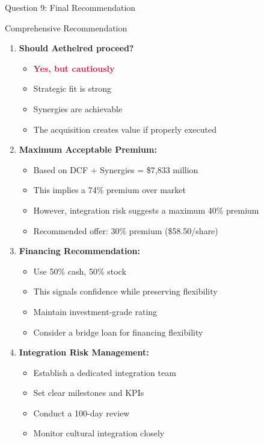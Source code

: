 \documentclass[aspectratio=169]{beamer}
\newcommand{\highlight}[1]{\textcolor{crimson}{\textbf{#1}}}
\begin{document}
	\begin{frame}{Question 9: Final Recommendation}
		
		\begin{block}{Comprehensive Recommendation}
			
			\begin{enumerate}
				\item \textbf{Should Aethelred proceed?}
				\begin{itemize}
					\item \highlight{Yes, but cautiously}
					\item Strategic fit is strong
					\item Synergies are achievable
					\item The acquisition creates value if properly executed
				\end{itemize}
				
				\item \textbf{Maximum Acceptable Premium:}
				\begin{itemize}
					\item Based on DCF + Synergies = \$7,833 million
					\item This implies a 74\% premium over market
					\item However, integration risk suggests a maximum 40\% premium
					\item Recommended offer: 30\% premium (\$58.50/share)
				\end{itemize}
				
				\item \textbf{Financing Recommendation:}
				\begin{itemize}
					\item Use 50\% cash, 50\% stock
					\item This signals confidence while preserving flexibility
					\item Maintain investment-grade rating
					\item Consider a bridge loan for financing flexibility
				\end{itemize}
				
				\item \textbf{Integration Risk Management:}
				\begin{itemize}
					\item Establish a dedicated integration team
					\item Set clear milestones and KPIs
					\item Conduct a 100-day review
					\item Monitor cultural integration closely
				\end{itemize}
			\end{enumerate}
		\end{block}
	\end{frame}
	
\end{document}
